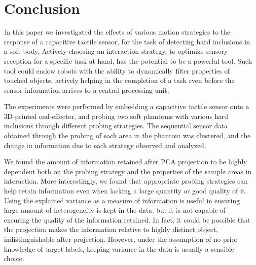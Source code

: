 \section{Conclusion} 	\label{sec_conclusion}

In this paper we investigated the effects of various motion strategies to the response of a capacitive 
tactile sensor, for the task of detecting hard inclusions in a soft body. 
Actively choosing an interaction strategy, to optimize sensory reception for a specific task at hand, has 
the potential to be a powerful tool. Such tool could endow robots with the ability to dynamically filter  
properties of touched objects, actively helping in the completion of a task \cite{olsson2004sensory, bohg2017interactive} 
even before the sensor information arrives to a central processing unit. 

The experiments were performed by embedding a capacitive tactile sensor onto a 3D-printed end-effector, 
and probing two soft phantoms with various hard inclusions through different probing strategies. 
The sequential sensor data obtained through the probing of each area in the phantom was clustered, 
and the change in information due to each strategy observed and analyzed. 

We found the amount of information retained after PCA projection to be highly dependent both on the 
probing strategy and the properties of the sample areas in interaction. More interestingly, 
we found that appropriate probing strategies can help retain information even when lacking a 
large quantity or good quality of it. 
Using the explained variance as a measure of information is useful in ensuring large amount of heterogeneity 
is kept in the data, but it is not capable of ensuring the quality of the information retained. In fact, 
it could be possible that the projection makes the information relative to highly distinct object, 
indistinguishable after projection. However, under the assumption of no prior knowledge of target labels, 
keeping variance in the data is usually a sensible choice.


